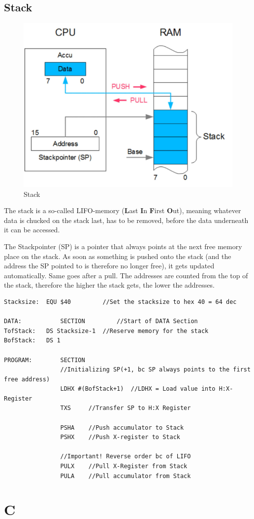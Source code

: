 \documentclass[a4paper, 11pt, nofootinbib]{book}
\begin{document}
\section{Stack}
\begin{figure}
	\centering
	\includegraphics[keepaspectratio=true,height=18\baselineskip]{stack.PNG}
	\caption{Stack}
	\label{fig:stack}
\end{figure}

The stack is a so-called LIFO-memory (\textbf{L}ast \textbf{I}n \textbf{F}irst \textbf{O}ut), meaning whatever data is chucked on the stack last, has to be removed, before the data underneath it can be accessed.
\vspace{10px}

\noindent The Stackpointer (SP) is a pointer that always points at the next free memory place on the stack. As soon as something is pushed onto the stack (and the address the SP pointed to is therefore no longer free), it gets updated automatically. Same goes after a pull. The addresses are counted from the top of the stack, therefore the higher the stack gets, the lower the addresses.

\newpage

\begin{lstlisting}[caption={Initialization of a stack}]
Stacksize:	EQU $40			//Set the stacksize to hex 40 = 64 dec

DATA:			SECTION			//Start of DATA Section	
TofStack:	DS Stacksize-1	//Reserve memory for the stack
BofStack:	DS 1

PROGRAM:		SECTION
				//Initializing SP(+1, bc SP always points to the first free address)
				LDHX #(BofStack+1)	//LDHX = Load value into H:X-Register
				TXS		//Transfer SP to H:X Register
			
				PSHA	//Push accumulator to Stack
				PSHX	//Push X-register to Stack
				
				//Important! Reverse order bc of LIFO
				PULX	//Pull X-Register from Stack
				PULA	//Pull accumulator from Stack
\end{lstlisting}

\chapter{C}
\end{document}
